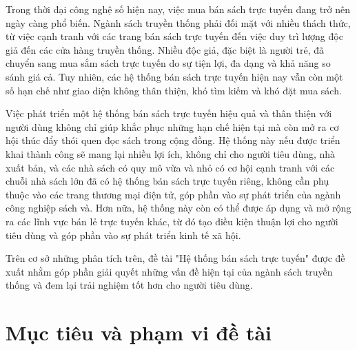 \documentclass[../DoAn.tex]{subfiles}
\begin{document}
Trong thời đại công nghệ số hiện nay, việc mua bán sách trực tuyến đang trở nên ngày càng phổ biến. Ngành sách truyền thống phải đối mặt với nhiều thách thức, từ việc cạnh tranh với các trang bán sách trực tuyến đến việc duy trì lượng độc giả đến các cửa hàng truyền thống. Nhiều độc giả, đặc biệt là người trẻ, đã chuyển sang mua sắm sách trực tuyến do sự tiện lợi, đa dạng và khả năng so sánh giá cả. Tuy nhiên, các hệ thống bán sách trực tuyến hiện nay vẫn còn một số hạn chế như giao diện không thân thiện, khó tìm kiếm và khó đặt mua sách.

Việc phát triển một hệ thống bán sách trực tuyến hiệu quả và thân thiện với người dùng không chỉ giúp khắc phục những hạn chế hiện tại mà còn mở ra cơ hội thúc đẩy thói quen đọc sách trong cộng đồng. Hệ thống này nếu được triển khai thành công sẽ mang lại nhiều lợi ích, không chỉ cho người tiêu dùng, nhà xuất bản, và các nhà sách có quy mô vừa và nhỏ có cơ hội cạnh tranh với các chuỗi nhà sách lớn đã có hệ thống bán sách trực tuyến riêng, không cần phụ thuộc vào các trang thương mại điện tử, góp phần vào sự phát triển của ngành công nghiệp sách và. Hơn nữa, hệ thống này còn có thể được áp dụng và mở rộng ra các lĩnh vực bán lẻ trực tuyến khác, từ đó tạo điều kiện thuận lợi cho người tiêu dùng và góp phần vào sự phát triển kinh tế xã hội.\

Trên cơ sở những phân tích trên, đề tài "Hệ thống bán sách trực tuyến" được đề xuất nhằm góp phần giải quyết những vấn đề hiện tại của ngành sách truyền thống và đem lại trải nghiệm tốt hơn cho người tiêu dùng.

\section{Mục tiêu và phạm vi đề tài}
\label{section:1.2}


\end{document}
